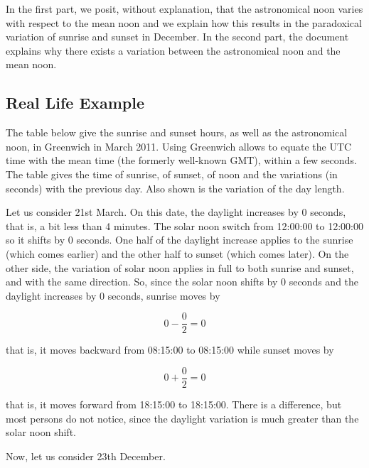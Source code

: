 \documentclass[a4paper]{article}
\newenvironment{texte}{\rmfamily}{}
\newcommand{\everisehhmmss}[0]{08:15:00}
\newcommand{\evenoonhhmmss}[0]{12:00:00}
\newcommand{\evesethhmmss}[0]{18:15:00}
\newcommand{\dayrisehhmmss}[0]{08:15:00}
\newcommand{\daynoonhhmmss}[0]{12:00:00}
\newcommand{\daysethhmmss}[0]{18:15:00}
\newcommand{\deltalight}[0]{0}
\newcommand{\deltarise}[0]{0}
\newcommand{\deltanoon}[0]{0}
\newcommand{\deltaset}[0]{0}
\newcommand{\formularise}[0]{\[ \deltanoon - \frac{\deltalight}{2} = \deltarise \]}
\newcommand{\formulaset}[0]{\[ \deltanoon + \frac{\deltalight}{2} = \deltaset \]}
\begin{document}
\begin{texte}
In the first part, we posit, without explanation, that
the astronomical noon varies with respect to the 
mean noon and we explain how this results in the 
paradoxical variation of sunrise and sunset in December.
In the second part, the document explains why there
exists a variation between the astronomical noon
and the mean noon.

\subsection{Real Life Example}

The table below give the sunrise and sunset hours, as well
as the astronomical noon, in Greenwich in March 2011.
Using Greenwich allows to equate the UTC time with
the mean time (the formerly well-known GMT), within a
few seconds. The table gives the time of sunrise,
of sunset, of noon and the variations (in seconds)
with the previous day. Also shown is the variation
of the day length.

\vspace{2mm}
\vspace{2mm}

Let us consider 21st March. On this date, the daylight
increases by \deltalight{} seconds, that is, a bit less
than 4 minutes. The solar noon switch
from \evenoonhhmmss{} to \daynoonhhmmss{} so it shifts
by \deltanoon{} seconds. One half of the daylight increase
applies to the sunrise (which comes earlier) and the other half to sunset
(which comes later). On the other side, the variation of 
solar noon applies in full to both sunrise and sunset, and
with the same direction. So, since the solar noon shifts
by \deltanoon{} seconds and the daylight increases by
\deltalight{} seconds, sunrise moves by

\formularise{}

that is, it moves backward from \everisehhmmss{} to \dayrisehhmmss{}
while sunset moves by

\formulaset{}

that is, it moves forward from \evesethhmmss{} to \daysethhmmss{}.
There is a difference, but most persons do not notice,
since the daylight variation is much greater than the
solar noon shift.

\vspace{5mm}

Now, let us consider 23th December.

\vspace{2mm}
\vspace{2mm}


\end{texte}
\end{document}
